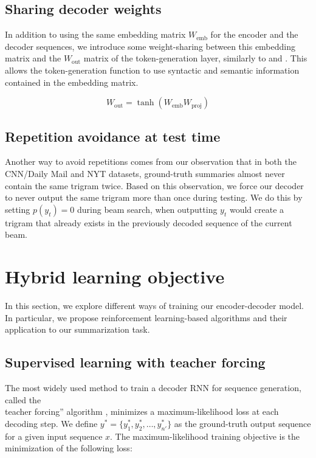 \subsection{Sharing decoder weights} In addition to using the same embedding matrix $W_\textrm{emb}$ for the encoder and the decoder sequences, we introduce some weight-sharing between this embedding matrix and the $W_\textrm{out}$ matrix of the token-generation layer, similarly to \citet{inan2016} and \citet{press2016}. This allows the token-generation function to use syntactic and semantic information contained in the embedding matrix.

\begin{equation}
W_\textrm{out} = \tanh(W_\textrm{emb} W_\textrm{proj})
\label{eq:shared-softmax}
\end{equation}

\subsection{Repetition avoidance at test time}

Another way to avoid repetitions comes from our observation that in both the CNN/Daily Mail and NYT datasets, ground-truth summaries almost never contain the same trigram twice. Based on this observation, we force our decoder to never output the same trigram more than once during testing. We do this by setting $p(y_t) = 0$ during beam search, when outputting $y_t$ would create a trigram that already exists in the previously decoded sequence of the current beam.

\section{Hybrid learning objective}
\label{sec:learning-objective}
In this section, we explore different ways of training our encoder-decoder model. In particular, we propose reinforcement learning-based algorithms and their application to our summarization task.

\subsection{Supervised learning with teacher forcing}

The most widely used method to train a decoder RNN for sequence generation, called the\\teacher forcing'' algorithm \citep{williams1989}, minimizes a maximum-likelihood loss at each decoding step. We define $y^* = \{y^*_1, y^*_2, \ldots, y^*_{n'}\}$ as the ground-truth output sequence for a given input sequence $x$. The maximum-likelihood training objective is the minimization of the following loss:

